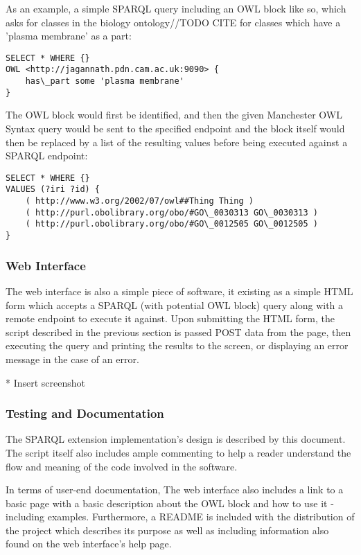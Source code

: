 \documentclass{article}
\begin{document}
As an example, a simple SPARQL query including an OWL block like so, which asks
for classes in the biology ontology//TODO CITE for classes which have a 'plasma
membrane' as a part:

\begin{lstlisting}
SELECT * WHERE {}
OWL <http://jagannath.pdn.cam.ac.uk:9090> {
    has\_part some 'plasma membrane'
}
\end{lstlisting}

The OWL block would first be identified, and then the given Manchester OWL
Syntax query would be sent to the specified endpoint and the block itself would
then be replaced by a list of the resulting values before being executed against
a SPARQL endpoint:

\begin{lstlisting}
SELECT * WHERE {} 
VALUES (?iri ?id) { 
    ( http://www.w3.org/2002/07/owl##Thing Thing ) 
    ( http://purl.obolibrary.org/obo/#GO\_0030313 GO\_0030313 ) 
    ( http://purl.obolibrary.org/obo/#GO\_0012505 GO\_0012505 ) 
}
\end{lstlisting}

\subsubsection{Web Interface}

The web interface is also a simple piece of software, it existing as a simple
HTML form which accepts a SPARQL (with potential OWL block) query along with a
remote endpoint to execute it against. Upon submitting the HTML form, the script
described in the previous section is passed POST data from the page, then
executing the query and printing the results to the screen, or displaying an
error message in the case of an error.

* Insert screenshot

\subsubsection{Testing and Documentation}

The SPARQL extension implementation's design is described by this document. The
script itself also includes ample commenting to help a reader understand the
flow and meaning of the code involved in the software.

In terms of user-end documentation, The web interface also includes a link to a 
basic page with a basic description
about the OWL block and how to use it - including examples. Furthermore, a
README is included with the distribution of the project which describes its
purpose as well as including information also found on the web interface's help
page.
\end{document}
